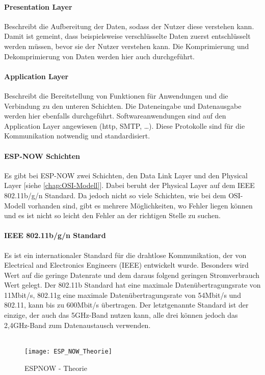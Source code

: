 \documentclass[titlepage,12pt,twoside]{article}
\begin{document}
\paragraph{Presentation Layer}
\label{par:Presentation Layer}
\hfill \break
\hfill \break
Beschreibt die Aufbereitung der Daten, sodass der Nutzer diese verstehen kann. Damit 
ist gemeint, dass beispielsweise verschlüsselte Daten zuerst entschlüsselt werden 
müssen, bevor sie der Nutzer verstehen kann. Die Komprimierung und Dekomprimierung 
von Daten werden hier auch durchgeführt. \\

\paragraph{Application Layer}
\label{par:Application Layer}
\hfill \break
\hfill \break
Beschreibt die Bereitstellung von Funktionen für Anwendungen und die Verbindung zu 
den unteren Schichten. Die Dateneingabe und Datenausgabe werden hier ebenfalls 
durchgeführt. Softwareanwendungen sind auf den Application Layer angewiesen (http, SMTP, …). 
Diese Protokolle sind für die Kommunikation notwendig und standardisiert. \\

\paragraph{ESP-NOW Schichten}
\hfill \break
\hfill \break
Es gibt bei ESP-NOW zwei Schichten, den Data Link Layer und den Physical Layer 
[siehe \textcolor{blue}{\autoref{chap:OSI-Modell}}]. Dabei beruht der Physical Layer auf dem IEEE 802.11b/g/n Standard. 
Da jedoch nicht so viele Schichten, wie bei dem OSI-Modell vorhanden sind, gibt es 
mehrere Möglichkeiten, wo Fehler liegen können und es ist nicht so leicht den Fehler 
an der richtigen Stelle zu suchen. \\
\newpage
\paragraph{IEEE 802.11b/g/n Standard}
\label{par:802.11b/g/n Standard}
\hfill \break
\hfill \break
Es ist ein internationaler Standard für die drahtlose Kommunikation, der von 
Electrical and Electronics Engineers (IEEE) entwickelt wurde. Besonders wird Wert auf 
die geringe Datenrate und dem daraus folgend geringen Stromverbrauch Wert gelegt. Der 
802.11b Standard hat eine maximale Datenübertragungsrate von 11Mbit/s, 802.11g eine 
maximale Datenübertragungsrate von 54Mbit/s und 802.11, kann bis zu 600Mbit/s übertragen. 
Der letztgenannte Standard ist der einzige, der auch das 5GHz-Band nutzen kann, alle 
drei können jedoch das 2,4GHz-Band zum Datenaustausch verwenden.  \\
\\
\begin{figure}[H]
	\begin{center}
		\scalebox{0.6}
		{\texttt{[image: ESP\_NOW\_Theorie]}}
		\caption{ESPNOW - Theorie}
		\label{fig:ESP_NOW_Theorie}
	\end{center}
\end{figure}
\newpage
\end{document}

